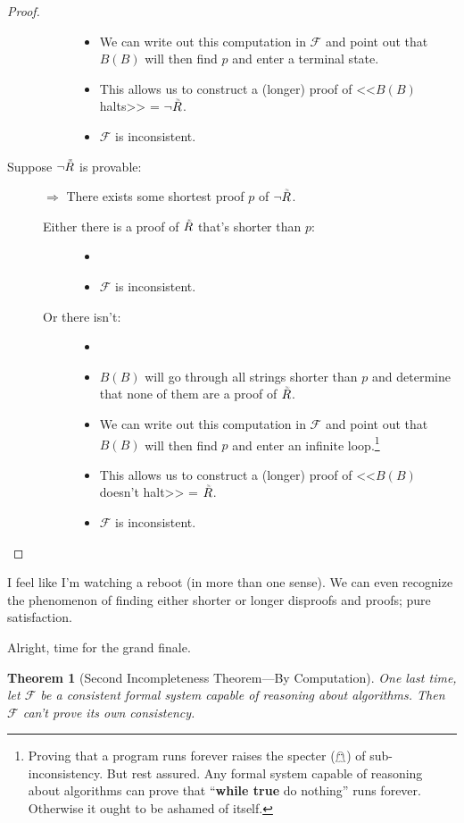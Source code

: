 \documentclass{article}
\newtheorem{theorem}{Theorem}
\newcommand{\F}{\ensuremath{\mathcal{F}}}
\newcommand{\iRosser}{\ensuremath{\accentset{\scalebox{0.35}{$\infty$}}{R}}}
\begin{document}
\begin{proof}
\begin{description}
\begin{description}
\begin{itemize}
\item We can write out this computation in $\F$ and point out that $B(B)$ will then find $p$ and enter a terminal state.
\item This allows us to construct a (longer) proof of <<$B(B)$ halts>> = $\neg \iRosser$.
\item $\F$ is inconsistent. \lightning
\end{itemize}
\end{description}
\item[Suppose $\neg \iRosser$ is provable:]
$\Rightarrow$ There exists some shortest proof $p$ of $\neg \iRosser$.
\begin{description}
\item[Either there is a proof of $\iRosser$ that's shorter than $p$:]
\begin{itemize}
\item[]
\item $\F$ is inconsistent. \lightning
\end{itemize}
\item[Or there isn't:]
\begin{itemize}
\item[]
\item $B(B)$ will go through all strings shorter than $p$ and determine that none of them are a proof of $\iRosser$.
\item We can write out this computation in $\F$ and point out that $B(B)$ will then find $p$ and enter an infinite loop.\footnote{Proving that a program runs forever raises the specter ($\mathghost$) of sub-inconsistency. But rest assured. Any formal system capable of reasoning about algorithms can prove that ``\textbf{while true} do nothing'' runs forever. Otherwise it ought to be ashamed of itself.}
\item This allows us to construct a (longer) proof of <<$B(B)$ doesn't halt>> = $\iRosser$.
\item $\F$ is inconsistent. \lightning
\end{itemize}
\end{description}
\end{description}
\end{proof}

I feel like I'm watching a reboot (in more than one sense). We can even recognize the phenomenon of finding either shorter or longer disproofs and proofs; pure satisfaction.

Alright, time for the grand finale.

\begin{theorem}[Second Incompleteness Theorem---By Computation]
One last time, let $\F$ be a consistent formal system capable of reasoning about algorithms. Then $\F$ can't prove its own consistency.
\end{theorem}
\end{document}
